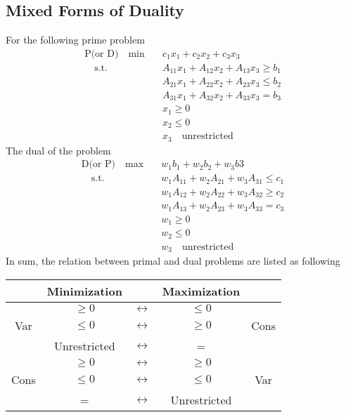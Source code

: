 			\subsection{Mixed Forms of Duality}
				For the following prime problem
				\begin{align}
					\text{P(or D)} \quad \min \quad & c_1x_1 + c_2x_2 + c_3x_3 \\
					\quad \text{s.t.} \quad & A_{11}x_1 + A_{12}x_2 + A_{13}x_3 \ge b_1 \\
											& A_{21}x_1 + A_{22}x_2 + A_{23}x_3 \le b_2 \\
											& A_{31}x_1 + A_{32}x_2 + A_{33}x_3 = b_3 \\
											& x_1 \ge 0 \\
											& x_2 \le 0 \\
											& x_3 \quad \text{unrestricted} 
				\end{align}
				The dual of the problem
				\begin{align}
					\text{D(or P)} \quad \max \quad & w_1b_1 + w_2b_2 + w_3b3 \\
					\quad \text{s.t.} \quad & w_1A_{11} + w_2A_{21} + w_3A_{31} \le c_1 \\
											& w_1A_{12} + w_2A_{22} + w_3A_{32} \ge c_2 \\
											& w_1A_{13} + w_2A_{23} + w_3A_{33} = c_3 \\
											& w_1 \ge 0 \\
											& w_2 \le 0 \\
											& w_3 \quad \text{unrestricted} 
				\end{align}
				In sum, the relation between primal and dual problems are listed as following\\
				\begin{tabular}{|c|c|c|c|c|}
					\hline & Minimization& & Maximization& \\
					\hline & $\geq 0$ & $\longleftrightarrow$ & $\leq 0$ & \\
					Var & $\leq 0$ & $\longleftrightarrow$ & $\geq 0$ & Cons \\
					& Unrestricted & $\longleftrightarrow$ & = & \\
					\hline & $\geq 0$ & $\longleftrightarrow$ & $\geq 0$ & \\
					Cons & $\leq 0$ & $\longleftrightarrow$ & $\leq 0$ & Var \\
					& = & $\longleftrightarrow$ & Unrestricted & \\
					\hline
				\end{tabular} 


